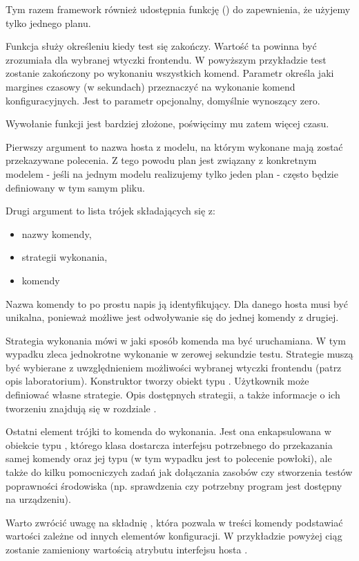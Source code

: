 \documentclass[00-praca-magisterska.tex]{subfiles}
\begin{document}
Tym razem framework również udostępnia funkcję () do
zapewnienia, że użyjemy tylko jednego planu.

Funkcja  służy określeniu kiedy test się zakończy.
Wartość ta powinna być zrozumiała dla wybranej wtyczki frontendu. W powyższym
przykładzie test zostanie zakończony po wykonaniu wszystkich komend. Parametr
 określa jaki margines czasowy (w sekundach)
przeznaczyć na wykonanie komend konfiguracyjnych. Jest to parametr opcjonalny,
domyślnie wynoszący zero.

Wywołanie funkcji  jest bardziej złożone, poświęcimy mu
zatem więcej czasu.

Pierwszy argument to nazwa hosta z modelu, na którym wykonane mają zostać
przekazywane polecenia. Z tego powodu plan jest związany z konkretnym modelem -
jeśli na jednym modelu realizujemy tylko jeden plan - często będzie definiowany
w tym samym pliku.

Drugi argument to lista trójek składających się z:
\begin{itemize}
\item nazwy komendy,
\item strategii wykonania,
\item komendy
\end{itemize}

Nazwa komendy to po prostu napis ją identyfikujący. Dla danego hosta musi być
unikalna, ponieważ możliwe jest odwoływanie się do jednej komendy z drugiej.

Strategia wykonania mówi w jaki sposób komenda ma być uruchamiana. W tym
wypadku  zleca jednokrotne wykonanie w zerowej sekundzie testu.
Strategie muszą być wybierane z uwzględnieniem możliwości wybranej wtyczki
frontendu (patrz opis laboratorium). Konstruktor  tworzy obiekt typu
. Użytkownik może definiować własne strategie. Opis dostępnych
strategii, a także informacje o ich tworzeniu znajdują się w rozdziale
.

Ostatni element trójki to komenda do wykonania. Jest ona enkapsulowana w
obiekcie typu , którego klasa dostarcza interfejsu
potrzebnego do przekazania samej komendy oraz jej typu (w tym wypadku jest to
polecenie powłoki), ale także do kilku pomocniczych zadań jak dołączania
zasobów czy stworzenia testów poprawności środowiska (np. sprawdzenia czy
potrzebny program jest dostępny na urządzeniu).

Warto zwrócić uwagę na składnię , która pozwala w treści komendy
podstawiać wartości zależne od innych elementów konfiguracji. W przykładzie
powyżej ciąg  zostanie zamieniony wartością atrybutu
 interfejsu  hosta .
\end{document}
